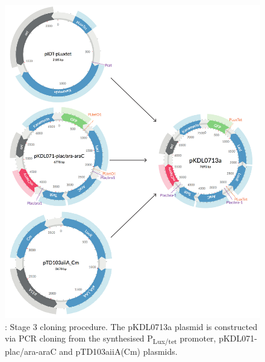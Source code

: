 \begin{figure}[htbp]
	\begin{center}
		\includegraphics[scale=0.7]{../../chapters/chapterDesignSwitches/images/stage3_cloning.pdf}
		\caption[Stage 3 cloning procedure.]{\label{fig:stage3}: Stage 3 cloning procedure. The pKDL0713a plasmid is constructed via PCR cloning from the synthesised P\textsubscript{Lux/tet} promoter, pKDL071-plac/ara-araC and pTD103aiiA(Cm) plasmids.}
	\end{center}
\end{figure}
\clearpage



